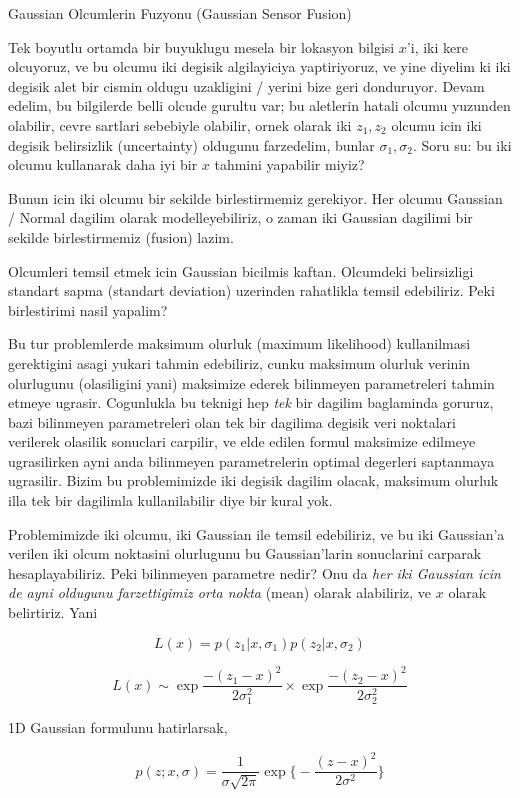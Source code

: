 \documentclass[12pt,fleqn]{article}\usepackage{../common}
\begin{document}
Gaussian Olcumlerin Fuzyonu (Gaussian Sensor Fusion)

Tek boyutlu ortamda bir buyuklugu mesela bir lokasyon bilgisi $x$'i, iki
kere olcuyoruz, ve bu olcumu iki degisik algilayiciya yaptiriyoruz, ve yine
diyelim ki iki degisik alet bir cismin oldugu uzakligini / yerini bize geri
donduruyor. Devam edelim, bu bilgilerde belli olcude gurultu var; bu
aletlerin hatali olcumu yuzunden olabilir, cevre sartlari sebebiyle
olabilir, ornek olarak iki $z_1,z_2$ olcumu icin iki degisik belirsizlik
(uncertainty) oldugunu farzedelim, bunlar $\sigma_1,\sigma_2$. Soru su: bu
iki olcumu kullanarak daha iyi bir $x$ tahmini yapabilir miyiz?

Bunun icin iki olcumu bir sekilde birlestirmemiz gerekiyor. Her olcumu
Gaussian / Normal dagilim olarak modelleyebiliriz, o zaman iki Gaussian
dagilimi bir sekilde birlestirmemiz (fusion) lazim. 

Olcumleri temsil etmek icin Gaussian bicilmis kaftan. Olcumdeki
belirsizligi standart sapma (standart deviation) uzerinden rahatlikla
temsil edebiliriz. Peki birlestirimi nasil yapalim?

Bu tur problemlerde maksimum olurluk (maximum likelihood) kullanilmasi
gerektigini asagi yukari tahmin edebiliriz, cunku maksimum olurluk verinin
olurlugunu (olasiligini yani) maksimize ederek bilinmeyen parametreleri
tahmin etmeye ugrasir. Cogunlukla bu teknigi hep {\em tek} bir dagilim
baglaminda goruruz, bazi bilinmeyen parametreleri olan tek bir dagilima
degisik veri noktalari verilerek olasilik sonuclari carpilir, ve elde
edilen formul maksimize edilmeye ugrasilirken ayni anda bilinmeyen
parametrelerin optimal degerleri saptanmaya ugrasilir. Bizim bu
problemimizde iki degisik dagilim olacak, maksimum olurluk illa tek bir
dagilimla kullanilabilir diye bir kural yok.

Problemimizde iki olcumu, iki Gaussian ile temsil edebiliriz, ve bu iki
Gaussian'a verilen iki olcum noktasini olurlugunu bu Gaussian'larin
sonuclarini carparak hesaplayabiliriz. Peki bilinmeyen parametre nedir? Onu
da {\em her iki Gaussian icin de ayni oldugunu farzettigimiz orta nokta}
(mean) olarak alabiliriz, ve $x$ olarak belirtiriz. Yani

$$ L(x) = p(z_1|x,\sigma_1) p(z_2|x,\sigma_2) $$

$$ L(x) \sim \exp{\frac{-(z_1-x)^2}{2\sigma_1^2} } 
\times \exp \frac{-(z_2-x)^2}{2\sigma_2^2} $$

1D Gaussian formulunu hatirlarsak, 

$$ p(z;x,\sigma) = \frac{1}{\sigma\sqrt{2\pi}} 
\exp \bigg\{ - \frac{(z-x)^2}{2\sigma^2}  \bigg\}
 $$
\end{document}

